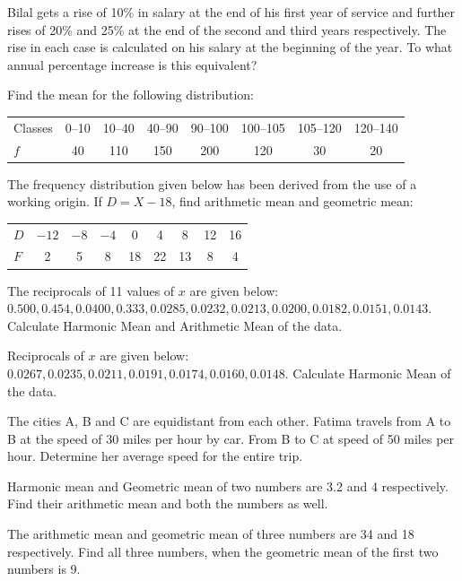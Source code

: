 \documentclass[11pt,a4paper]{article}
\begin{document}
\begin{longlist}
\item Bilal gets a rise of 10\% in salary at the end of his first year of service and further rises of 20\% and 25\% at the end of the second and third years respectively. The rise in each case is calculated on his salary at the beginning of the year. To what annual percentage increase is this equivalent?

\item Find the mean for the following distribution:
\begin{center}
\begin{tabular}{l|ccccccc}
Classes & 0--10 & 10--40 & 40--90 & 90--100 & 100--105 & 105--120 & 120--140 \\
$f$ & 40 & 110 & 150 & 200 & 120 & 30 & 20
\end{tabular}
\end{center}

\item The frequency distribution given below has been derived from the use of a working origin. If $D=X-18$, find arithmetic mean and geometric mean:
\begin{center}
\begin{tabular}{l|cccccccc}
$D$ & $-12$ & $-8$ & $-4$ & 0 & 4 & 8 & 12 & 16 \\
$F$ & 2 & 5 & 8 & 18 & 22 & 13 & 8 & 4
\end{tabular}
\end{center}

\item The reciprocals of 11 values of $x$ are given below: $0.500, 0.454, 0.0400, 0.333, 0.0285, 0.0232, 0.0213, 0.0200, 0.0182, 0.0151, 0.0143$. Calculate Harmonic Mean and Arithmetic Mean of the data.

\item Reciprocals of $x$ are given below: $0.0267, 0.0235, 0.0211, 0.0191, 0.0174, 0.0160, 0.0148$. Calculate Harmonic Mean of the data.

\item The cities A, B and C are equidistant from each other. Fatima travels from A to B at the speed of 30 miles per hour by car. From B to C at speed of 50 miles per hour. Determine her average speed for the entire trip.

\item Harmonic mean and Geometric mean of two numbers are 3.2 and 4 respectively. Find their arithmetic mean and both the numbers as well.

\item The arithmetic mean and geometric mean of three numbers are 34 and 18 respectively. Find all three numbers, when the geometric mean of the first two numbers is 9.


\end{longlist}
\end{document}
